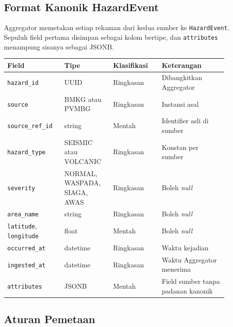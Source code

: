 \subsection{Format Kanonik HazardEvent}

Aggregator memetakan setiap rekaman dari kedua sumber ke \texttt{HazardEvent}. Sepuluh field pertama disimpan sebagai kolom bertipe, dan \texttt{attributes} menampung sisanya sebagai JSONB.

\begin{longtable}[]{|>{\raggedright\arraybackslash}p{0.22\linewidth}|>{\raggedright\arraybackslash}p{0.2\linewidth}|>{\raggedright\arraybackslash}p{0.2\linewidth}|>{\raggedright\arraybackslash}p{0.277\linewidth}|}
\hline
Field & Tipe & Klasifikasi & Keterangan \\
\hline
\endhead
\texttt{hazard\_id} & UUID & Ringkasan & Dibangkitkan Aggregator \\
\hline
\texttt{source} & BMKG atau PVMBG & Ringkasan & Instansi asal \\
\hline
\texttt{source\_ref\_id} & string & Mentah & Identifier asli di sumber \\
\hline
\texttt{hazard\_type} & SEISMIC atau VOLCANIC & Ringkasan & Konstan per sumber \\
\hline
\texttt{severity} & NORMAL, WASPADA, SIAGA, AWAS & Ringkasan & Boleh \textit{null} \\
\hline
\texttt{area\_name} & string & Ringkasan & Boleh \textit{null} \\
\hline
\texttt{latitude}, \texttt{longitude} & float & Mentah & Boleh \textit{null} \\
\hline
\texttt{occurred\_at} & datetime & Ringkasan & Waktu kejadian \\
\hline
\texttt{ingested\_at} & datetime & Ringkasan & Waktu Aggregator menerima \\
\hline
\texttt{attributes} & JSONB & Mentah & Field sumber tanpa padanan kanonik \\
\hline
\end{longtable}

\subsection{Aturan Pemetaan}


